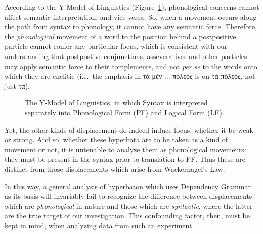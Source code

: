 \documentclass[letterpaper, 11pt]{article}
\begin{document}
According to the Y-Model of Linguistics (Figure~\ref{fig:y-model}), phonological
concerns cannot affect semantic interpretation, and vice versa. So, when a
movement occurs along the path from syntax to phonology, it cannot have any
semantic force. Therefore, the \emph{phonological} movement of a word to the
position behind a postpositive particle cannot confer any particular focus,
which is consistent with our understanding that postpostive conjunctions,
asseveratives and other particles may apply semantic force to their complements,
and not \emph{per se} to the words onto which they are enclitic (i.e.\ the
emphasis in \textgreek{τὰ μὲν ...  πόλεος} is on \textgreek{τὰ πόλεος}, not just
\textgreek{τά}).

\begin{figure}[h!]
\caption{The Y-Model of Linguistics, in which Syntax is interpreted
separately into Phonological Form (PF) and Logical Form (LF).}
\label{fig:y-model}
\end{figure}

Yet, the other kinds of displacement do indeed induce focus, whether it be weak
or strong. And so, whether these hyperbata are to be taken as a kind of movement
or not, it is untenable to analyze them as phonological movements: they must be
present in the syntax prior to translation to PF. Thus these are distinct from
those displacements which arise from Wackernagel's Law.

In this way, a general analysis of hyperbaton which uses Dependency Grammar as its
basis will invariably fail to recognize the difference between displacements
which are \emph{phonological} in nature and those which are \emph{syntactic},
where the latter are the true target of our investigation. This confounding
factor, then, must be kept in mind, when analyzing data from such an
experiment.

\nocite{sophocles1999sophocles, euripides2002euripides}


\newpage
\end{document}
